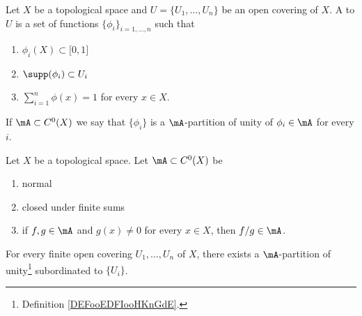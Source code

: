 \begin{definition}      \label{DEFooEDFIooHKnGdE}
	Let \( X\) be a topological space and \( U=\{ U_1,\ldots, U_n \}\) be an open covering of \( X\). A  to \( U\) is a set of functions \( \{ \phi_i \}_{i=1,\ldots, n}\) such that
	\begin{enumerate}
		\item
		      \( \phi_i(X)\subset \mathopen[ 0 , 1 \mathclose]\)
		\item
		      \( \supp(\phi_i)\subset U_i\)
		\item
		      \( \sum_{i=1}^n\phi(x)=1\) for every \( x\in X\).
	\end{enumerate}
	If \( \mA\subset C^0(X)\) we say that \( \{ \phi_i \}\) is a \( \mA\)-partition of unity of \( \phi_i\in \mA\) for every \( i\).
\end{definition}

\begin{theorem}       \label{THOooUGQCooFVySMP}
	Let \( X\) be a topological space. Let \( \mA\subset C^0(X)\) be
	\begin{enumerate}
		\item
		      normal
		\item
		      closed under finite sums
		\item
		      if \( f,g\in\mA\) and \( g(x)\neq 0\) for every \( x\in X\), then \( f/g\in \mA\).
	\end{enumerate}
	For every finite open covering \( U_1,\ldots, U_n\) of \( X\), there exists a \( \mA\)-partition of unity\footnote{Definition \ref{DEFooEDFIooHKnGdE}.} subordinated to \( \{ U_i \}\).
\end{theorem}
